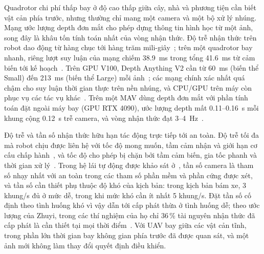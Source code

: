 \documentclass[11pt,a4paper]{article}
\theoremstyle{plain}
\theoremstyle{definition}
\theoremstyle{remark}
\begin{document}
Quadrotor chi phí thấp bay ở độ cao thấp giữa cây, nhà và phương tiện cần biết vật cản phía trước, nhưng thường chỉ mang một camera và một bộ xử lý nhúng. Mạng ước lượng depth đơn mắt cho phép dựng thông tin hình học từ một ảnh, song đây là khâu tốn tính toán nhất của vòng nhận thức. Độ trễ nhận thức trên robot dao động từ hàng chục tới hàng trăm mili-giây~\cite{falanga2019}; trên một quadrotor bay nhanh, riêng lượt suy luận của mạng chiếm 38.9~ms trong tổng 41.6~ms từ cảm biến tới kế hoạch~\cite{loquercio2021}. Trên GPU V100, Depth Anything V2 cần từ 60~ms (biến thể Small) đến 213~ms (biến thể Large) mỗi ảnh~\cite{yang2024b}; các mạng chính xác nhất quá chậm cho suy luận thời gian thực trên nền nhúng, và CPU/GPU trên máy còn phục vụ các tác vụ khác~\cite{wofk2019}. Trên một MAV dùng depth đơn mắt với phần tính toán đặt ngoài máy bay (GPU RTX 4090), ước lượng depth mất 0.11--0.16~s mỗi khung cộng 0.12~s trễ camera, và vòng nhận thức đạt 3--4~Hz~\cite{simon2023}.

Độ trễ và tần số nhận thức hữu hạn tác động trực tiếp tới an toàn. Độ trễ tối đa mà robot chịu được liên hệ với tốc độ mong muốn, tầm cảm nhận và giới hạn cơ cấu chấp hành~\cite{falanga2019}, và tốc độ cho phép bị chặn bởi tầm cảm biến, gia tốc phanh và thời gian xử lý~\cite{liu2016}. Trong hệ lái tự động được khảo sát ở~\cite{zhao2021}, tần số camera là tham số nhạy nhất với an toàn trong các tham số phần mềm và phần cứng được xét, và tần số cần thiết phụ thuộc độ khó của kịch bản: trong kịch bản bám xe, 3 khung/s đủ ở mức dễ, trong khi mức khó cần ít nhất 5 khung/s. Đặt tần số cố định theo tình huống khó vì vậy dẫn tới cấp phát thừa ở tình huống dễ; theo ước lượng của Zhuyi, trong các thí nghiệm của họ chỉ 36\,\% tài nguyên nhận thức đã cấp phát là cần thiết tại mọi thời điểm~\cite{hsiao2022}. Với UAV bay giữa các vật cản tĩnh, trong phần lớn thời gian bay không gian phía trước đã được quan sát, và một ảnh mới không làm thay đổi quyết định điều khiển.
\end{document}
